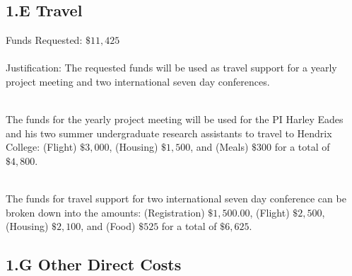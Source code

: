 \documentclass[11pt]{article}
\begin{document}
\subsection*{1.E Travel}
\label{subsec:travel}
Funds Requested: $\$11,425$\\ \ \\ Justification: The requested funds
will be used as travel support for a yearly project meeting and two
international seven day conferences.

\ \\ The funds for the yearly project meeting will be used for the PI
Harley Eades and his two summer undergraduate research assistants to
travel to Hendrix College: (Flight) $\$3,000$, (Housing) $\$1,500$,
and (Meals) $\$300$ for a total of $\$4,800$.

\ \\ The funds for travel support for two international seven day
conference can be broken down into the amounts: (Registration) $\$1,500.00$,
(Flight) $\$2,500$, (Housing) $\$2,100$, and (Food) $\$525$ for a total of
$\$6,625$.  

\subsection*{1.G Other Direct Costs}
\label{subsec:other}
\end{document}
